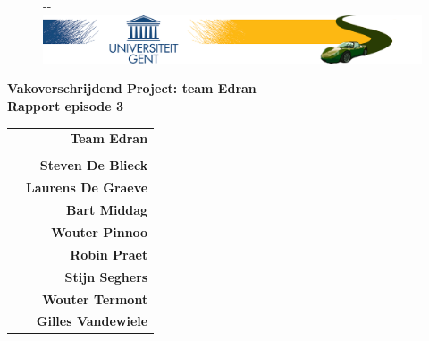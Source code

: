 \documentclass[11pt,a4paper,oneside]{article}
\begin{document}
\begin{titlepage}

\thispagestyle{fancy}
\fancyhf{}
\fancyfoot[L]{}
\begin{figure}[!ht]
  \begin{adjustwidth}{-\oddsidemargin-1in}{-\rightmargin}
    \centering
    \includegraphics[width=\paperwidth]{banner}
  \end{adjustwidth}
\end{figure}
\vspace{-0.2em}
\begin{center}
\vspace{5cm}
\Huge \textbf{Vakoverschrijdend Project: team Edran\\ Rapport episode 3}\\
\vspace{6.0cm}
\large
\begin{tabular}{L! {} R}
& {\LARGE\bf Team Edran} \\
& \\
& {\bf Steven De Blieck} \\
& {\bf Laurens De Graeve} \\
& {\bf Bart Middag} \\
& {\bf Wouter Pinnoo} \\
& {\bf Robin Praet} \\
& {\bf Stijn Seghers} \\
& {\bf Wouter Termont} \\
& {\bf Gilles Vandewiele} \\
\end{tabular}
\end{center}
\end{titlepage}
\newpage

\fancyheadoffset[RO,LE]{0in}

\fancyfoot[L]{}
\fancyfoot[C]{\thepage}
\pagestyle{fancy}
\tableofcontents
\newpage

\setcounter{section}{0}
\setcounter{subsection}{0}
\end{document}
